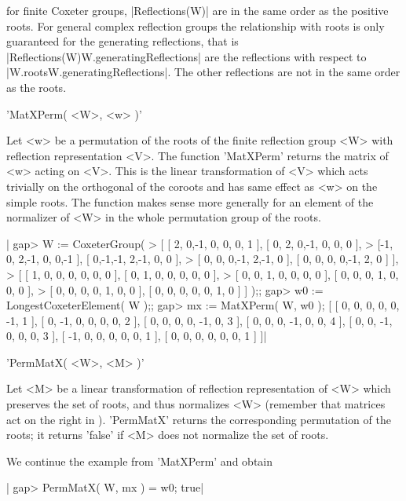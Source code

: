 for  finite Coxeter groups,  |Reflections(W)| are in  the same order as the
positive roots. For general complex reflection groups the relationship with
roots   is  only  guaranteed  for   the  generating  reflections,  that  is
|Reflections(W){W.generatingReflections}|  are the reflections with respect
to |W.roots{W.generatingReflections}|. The other reflections are not in the
same order as the roots.


'MatXPerm( <W>, <w> )'

Let  <w> be a permutation  of the roots of  the finite reflection group <W>
with  reflection representation  <V>. The  function 'MatXPerm'  returns the
matrix of <w> acting on <V>. This is the linear transformation of <V> which
acts  trivially on the orthogonal of the coroots and has same effect as <w>
on the simple roots. The function makes sense more generally for an element
of the normalizer of <W> in the whole permutation group of the roots.

|    gap> W := CoxeterGroup(
    > [ [ 2, 0,-1, 0, 0, 0, 1 ], [ 0, 2, 0,-1, 0, 0, 0 ],
    >   [-1, 0, 2,-1, 0, 0,-1 ], [ 0,-1,-1, 2,-1, 0, 0 ],
    >   [ 0, 0, 0,-1, 2,-1, 0 ], [ 0, 0, 0, 0,-1, 2, 0 ] ],
    > [ [ 1, 0, 0, 0, 0, 0, 0 ], [ 0, 1, 0, 0, 0, 0, 0 ],
    >   [ 0, 0, 1, 0, 0, 0, 0 ], [ 0, 0, 0, 1, 0, 0, 0 ],
    >   [ 0, 0, 0, 0, 1, 0, 0 ], [ 0, 0, 0, 0, 0, 1, 0 ] ] );;
    gap> w0 := LongestCoxeterElement( W );;
    gap> mx := MatXPerm( W, w0 );
    [ [ 0, 0, 0, 0, 0, -1, 1 ], [ 0, -1, 0, 0, 0, 0, 2 ],
      [ 0, 0, 0, 0, -1, 0, 3 ], [ 0, 0, 0, -1, 0, 0, 4 ],
      [ 0, 0, -1, 0, 0, 0, 3 ], [ -1, 0, 0, 0, 0, 0, 1 ],
      [ 0, 0, 0, 0, 0, 0, 1 ] ]|


'PermMatX( <W>, <M> )'

Let <M> be  a linear transformation of reflection  representation of <W>
which  preserves the  set of  roots, and  thus normalizes  <W> (remember
that  matrices  act on  the  right in  {\GAP}). 'PermMatX'  returns  the
corresponding permutation of  the roots; it returns 'false'  if <M> does
not normalize the set of roots.

We continue the example from 'MatXPerm' and obtain\:

|    gap> PermMatX( W, mx ) = w0;
    true|

